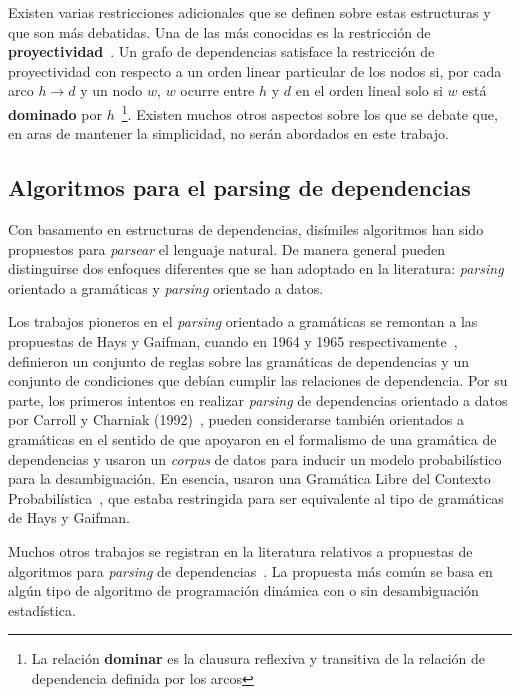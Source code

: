 Existen varias restricciones adicionales que se definen sobre estas estructuras y que son m\'as debatidas. Una de las m\'as conocidas es la restricci\'on de \textbf{proyectividad}~\cite{hays1964dependency,lecerf1960programme,marcus1965notion}. Un grafo de dependencias satisface la restricci\'on de proyectividad con respecto a un orden linear particular de los nodos si, por cada arco $h \rightarrow d$ y un nodo $w$, $w$ ocurre entre $h$ y $d$ en el orden lineal solo si $w$ est\'a \textbf{dominado} por $h$~\footnote{La relaci\'on \textbf{dominar} es la clausura reflexiva y transitiva de la relaci\'on de dependencia definida por los arcos}. Existen muchos otros aspectos sobre los que se debate que, en aras de mantener la simplicidad, no ser\'an abordados en este trabajo. 

\subsection{Algoritmos para el parsing de dependencias}

Con basamento en estructuras de dependencias, dis\'imiles algoritmos han sido propuestos para \emph{parsear} el lenguaje natural.
De manera general pueden distinguirse dos enfoques diferentes que se han adoptado en la literatura: \emph{parsing} orientado a gram\'aticas y \emph{parsing} orientado a datos. 

Los trabajos pioneros en el \emph{parsing} orientado a gram\'aticas se remontan a las propuestas de Hays y Gaifman, cuando en 1964 y 1965 respectivamente~\cite{hays1964dependency,gaifman1965dependency}, definieron un conjunto de reglas sobre las gram\'aticas de dependencias y un conjunto de condiciones que deb\'ian cumplir las relaciones de dependencia. Por su parte, los primeros intentos en realizar \emph{parsing} de dependencias orientado a datos por Carroll y Charniak (1992)~\cite{carroll1992two}, pueden considerarse tambi\'en orientados a gram\'aticas en el sentido de que apoyaron en el formalismo de una gram\'atica de dependencias y usaron un \emph{corpus} de datos para inducir un modelo probabil\'istico para la desambiguaci\'on. En esencia, usaron una Gram\'atica Libre del Contexto Probabil\'istica~\cite{chomsky1956three}, que estaba restringida para ser equivalente al tipo de gram\'aticas de Hays y Gaifman. 

Muchos otros trabajos se registran en la literatura relativos a propuestas de algoritmos para \emph{parsing} de dependencias~\cite{koo2008simple,mcdonald2005non,nivre2003efficient,nivre2007maltparser,socher2011parsing}. La propuesta m\'as com\'un se basa en alg\'un tipo de algoritmo de programaci\'on din\'amica con o sin desambiguaci\'on estad\'istica.


